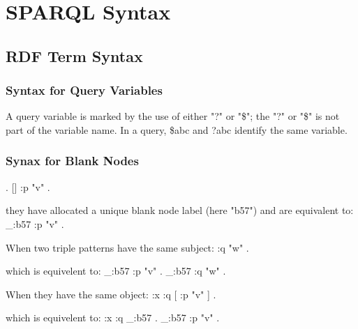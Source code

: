 \newenvironment{fullgreenverb}
{\verbbox}
{\endverbbox\par\colorbox[RGB]{204,255,204}{\parbox{\textwidth}{\theverbbox}}\par}

\newenvironment{fullblueverb}
{\verbbox}
{\endverbbox\par\colorbox[RGB]{204,229,255}{\parbox{\textwidth}{\theverbbox}}\par}
\newenvironment{fullgrayverb}
{\verbbox}
{\endverbbox\par\colorbox[RGB]{211,211,211}{\parbox{\textwidth}{\theverbbox}}\par}

\section{SPARQL Syntax}
\subsection{RDF Term Syntax}
\subsubsection{Syntax for Query Variables}
A query variable is marked by the use of either "?" or "\$"; the "?" or "\$" is not part of the variable name. In a query, \$abc and ?abc identify the same variable.
\subsubsection{Synax for Blank Nodes}
\begin{fullblueverb}
[ :p "v" ] .
[] :p "v" .
\end{fullblueverb}
they have allocated a unique blank node label (here "b57") and are equivalent to:
\begin{fullblueverb}
_:b57 :p "v" .
\end{fullblueverb}
When two triple patterns have the same subject:
\begin{fullblueverb}
[ :p "v" ] :q "w" .
\end{fullblueverb}
which is equivelent to:
\begin{fullblueverb}
_:b57 :p "v" .
_:b57 :q "w" .
\end{fullblueverb}
When they have the same object:
\begin{fullblueverb}
:x :q [ :p "v" ] .
\end{fullblueverb}
which is equivelent to:
\begin{fullblueverb}
:x  :q _:b57 .
_:b57 :p "v" .
\end{fullblueverb}
